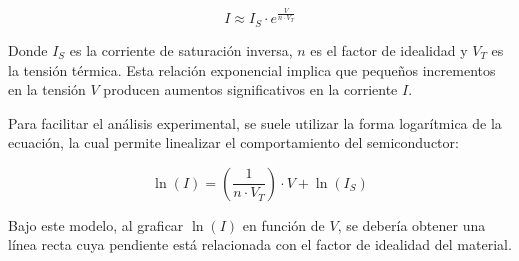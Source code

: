\begin{equation}
    I \approx I_S \cdot e^{\frac{V}{n \cdot V_T}}
    \label{eq:shockley}
\end{equation}

Donde $I_S$ es la corriente de saturación inversa, $n$ es el factor de idealidad y $V_T$ es la tensión térmica. Esta relación exponencial implica que pequeños incrementos en la tensión $V$ producen aumentos significativos en la corriente $I$.

Para facilitar el análisis experimental, se suele utilizar la forma logarítmica de la ecuación, la cual permite linealizar el comportamiento del semiconductor:

\begin{equation}
    \ln(I) = \left(\frac{1}{n \cdot V_T}\right) \cdot V + \ln(I_S)
\end{equation}

Bajo este modelo, al graficar $\ln(I)$ en función de $V$, se debería obtener una línea recta cuya pendiente está relacionada con el factor de idealidad del material.

\vspace{\fill}

\pagebreak